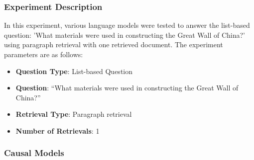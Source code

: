 \documentclass{wseas}
\begin{document}
\subsubsection{Experiment Description}

In this experiment, various language models were tested to answer the
list-based question: 'What materials were used in constructing the
Great Wall of China?' using paragraph retrieval with one retrieved
document. The experiment parameters are as follows:

\begin{itemize}

\item
  \textbf{Question Type}: List-based Question
\item
  \textbf{Question}: ``What materials were used in constructing the
  Great Wall of China?''
\item
  \textbf{Retrieval Type}: Paragraph retrieval
\item
  \textbf{Number of Retrievals}: 1
\end{itemize}

\subsubsection{Causal Models}
\end{document}
